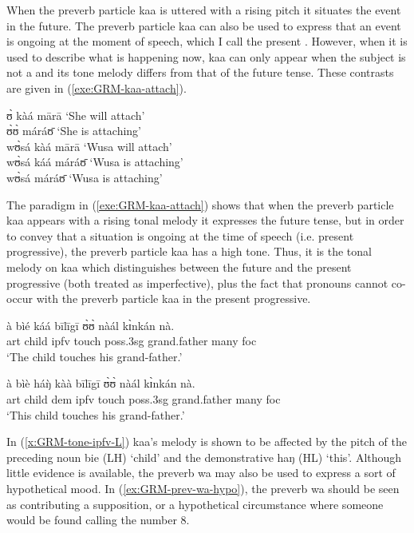 \begin{exe}
\begin{exe}
\begin{exe}
\begin{exe}
\begin{exe}
\begin{exe}
\begin{exe}
\begin{exe}
\begin{exe}
\begin{exe}
\begin{exe}
When the preverb particle {\sls kaa} is uttered with a rising pitch it situates the event in the future. The preverb particle {\sls kaa} can also be used to express that an event is ongoing at the moment of speech, which I call the present .   However,  when it is used to describe what is happening now, {\sls kaa} can only appear when the subject is not a  and its tone melody differs from that of the future tense. These contrasts are given in (\ref{exe:GRM-kaa-attach}).

\ea\label{exe:GRM-kaa-attach}
 ʊ̀ kàá mārā   {\rm `She will attach'}\\
   ʊ̀ʊ̀ máráʊ̄   {\rm  `She  is attaching'}\\
wʊ̀sá kàá mārā   {\rm  `Wusa will attach'}\\
wʊ̀sá káá   máráʊ̄  {\rm  `Wusa is attaching'}\\
\textasteriskcentered  wʊ̀sá   máráʊ̄   {\rm `Wusa is
attaching'}
\z

The paradigm in  (\ref{exe:GRM-kaa-attach}) shows that when the preverb particle {\sls kaa} appears with a rising tonal melody it  expresses the future tense, but  in order to convey that a situation is ongoing at the time of speech (i.e. present progressive), the preverb particle {\sls kaa} has a high tone. Thus, it is the tonal melody on {\sls kaa}  which distinguishes between the future and the present progressive (both treated as imperfective),  plus the fact that pronouns cannot co-occur with the preverb particle {\sls kaa} in the present progressive.

\ea\label{x:GRM-tone-ipfv}
\ea\label{x:GRM-tone-ipfv-H}
\gll à bìé káá bīlīgī ʊ̀ʊ̀ nàál kɪ̀nkán nà.\\
{\sc art} child {\sc ipfv} touch {\sc poss.3sg} grand.father many  {\sc 
foc}\\
\glt `The child touches his grand-father.'

\ex\label{x:GRM-tone-ipfv-L}
\gll à bìè háŋ̀ kàà bīlīgī ʊ̀ʊ̀ nàál kɪ̀nkán nà.\\
{\sc art} child {\sc dem} {\sc ipfv} touch {\sc poss.3sg} grand.father  many   {\sc 
foc}\\
\glt `This child touches his grand-father.'

\z
\z


 In (\ref{x:GRM-tone-ipfv-L}) {\sls kaa}'s melody is shown to be affected by   the pitch  of   the  preceding  noun {\sls bie} (LH) `child' and the demonstrative {\sls haŋ} (HL) `this'.  Although little evidence is available, the preverb {\sls wa} may also be used to
express a sort of hypothetical  mood.  In  (\ref{ex:GRM-prev-wa-hypo}), the
preverb {\sls wa} should be seen as contributing a supposition, or a 
hypothetical
circumstance where
someone would be found calling the number 8. 


\end{exe}
\end{exe}
\end{exe}
\end{exe}
\end{exe}
\end{exe}
\end{exe}
\end{exe}
\end{exe}
\end{exe}
\end{exe}

